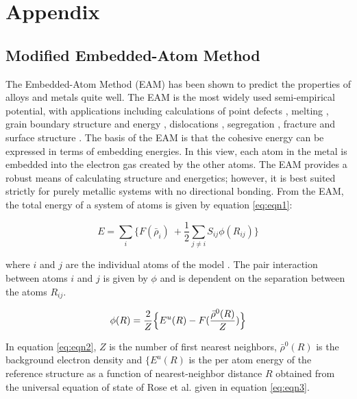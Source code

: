 \documentclass[review]{elsarticle}
\begin{document}
\section{Appendix}

\subsection{Modified Embedded-Atom Method}
The Embedded-Atom Method (EAM) \cite{daw1984, daw1993, daw1983} has been shown to predict the properties of alloys and metals quite well. The EAM is the most widely used semi-empirical potential, with applications including calculations of point defects \cite{olsson2009}, melting \cite{belaschenko2011}, grain boundary structure and energy \cite{liu1999}, dislocations \cite{chassange2011}, segregation \cite{li2009MatChem}, fracture \cite{vatne2011} and surface structure \cite{rose1984}.  The basis of the EAM is that the cohesive energy can be expressed in terms of embedding energies.  In this view, each atom in the metal is embedded into the electron gas created by the other atoms.  The EAM provides a robust means of calculating structure and energetics; however, it is best suited strictly for purely metallic systems with no directional bonding.
From the EAM, the total energy of a system of atoms is given by equation \ref{eq:eqn1}:


\begin{equation}
\label{eq:eqn1}
E = \sum_{i} \{F(\bar{\rho}_{i})\ +  \frac{1}{2} \sum_{j \neq i} S_{ij}\phi(R_{ij})   \}
\end{equation}

where $i$ and $j$ are the individual atoms of the model \cite{daw1983, daw1984}.  The pair interaction between atoms $i$ and $j$ is given by $\phi$ \cite{baskes1992} and is dependent on the separation between the atoms $R_{ij}$.

\begin{equation}
\label{eq:eqn2}
\phi(R) = \frac{2}{Z} \Bigl\{ E^{u}(R) - F( \frac{ \bar{ \rho}^{0}(R)}{Z}) \Bigr\}  
\end{equation}

In equation \ref{eq:eqn2}, $Z$ is the number of first nearest neighbors, $\bar{ \rho}^{0}(R)$ is the background electron density and $\{E^{u}(R)$ is the per atom energy of the reference structure as a function of nearest-neighbor distance $R$ \cite{baskes2000} obtained from the universal equation of state of Rose et al. \cite{rose1984} given in equation \ref{eq:eqn3}.
\end{document}
